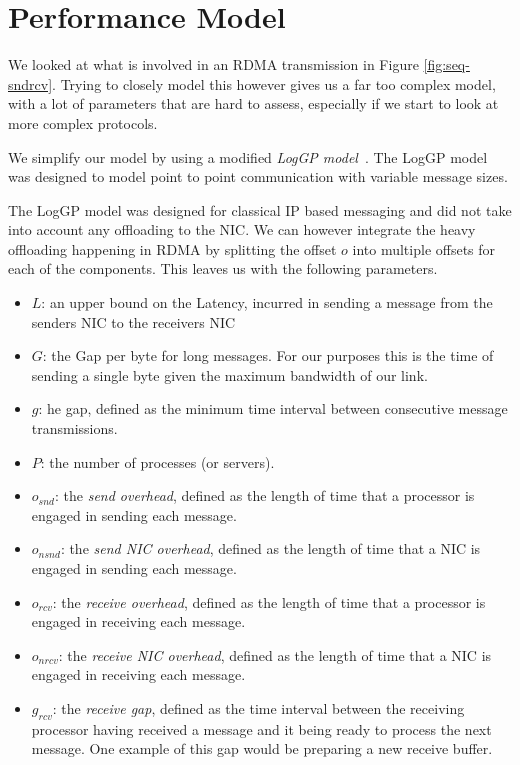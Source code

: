 \section{Performance Model}\label{sec:perf-model}
We looked at what is involved in an RDMA transmission in Figure \ref{fig:seq-sndrcv}.
Trying to closely model this however gives us a far too complex model, with a lot of parameters that are hard to assess,
especially if we start to look at more complex protocols. 

We simplify our model by using a modified \emph{LogGP model}~\cite{}. The LogGP model was designed to model point to point
communication with variable message sizes. 


The LogGP model was designed for classical IP based messaging and did not take into account any offloading to the NIC. We 
can however integrate the heavy offloading happening in RDMA by splitting the offset $o$ into multiple offsets for each
of the components. This leaves us with the following parameters.


\begin{itemize}
  \item $L$: an upper bound on the Latency, incurred in sending a message from the senders NIC to the receivers NIC
  \item $G$: the Gap per byte for long messages. For our purposes this is the time of sending a single byte given the 
    maximum bandwidth of our link.
  \item $g$: he gap, defined as the minimum time interval between consecutive message transmissions.
  \item $P$: the number of processes (or servers).
  \item $o_{snd}$: the \emph{send overhead}, defined as the length of time that a processor is engaged in sending each message.
  \item $o_{nsnd}$: the \emph{send NIC overhead}, defined as the length of time that a NIC is engaged in sending each message.
  \item $o_{rcv}$: the \emph{receive overhead}, defined as the length of time that a processor is engaged in receiving each message.
  \item $o_{nrcv}$: the \emph{receive NIC overhead}, defined as the length of time that a NIC is engaged in receiving each message.
  \item $g_{rcv}$: the \emph{receive gap}, defined as the time interval between the receiving processor having received a message 
    and it being ready to process the next message. One example of this gap would be preparing a new receive buffer.
\end{itemize}

